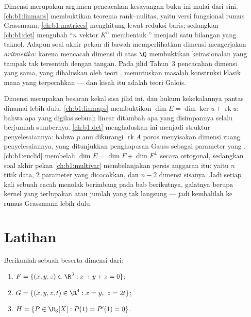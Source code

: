 \begin{remark}
\label{rem:b1:findim:whereused}
Dimensi merupakan argumen pencacahan kesayangan buku ini mulai dari sini.
\cref{ch:b1:linmaps} membuktikan teorema rank--nulitas, yaitu
versi fungsional rumus Grassmann; \cref{ch:b1:matrices}
menghitung  lewat reduksi baris; sedangkan \cref{ch:b1:det} mengubah ``$n$
vektor $K^n$ membentuk '' menjadi satu bilangan yang taknol. Adapun
soal akhir pekan di bawah memperlihatkan dimensi mengerjakan \emph{aritmetika}:
karena mencacah dimensi di atas  $\Q$ membuktikan 
keirasionalan yang tampak tak tersentuh dengan tangan. Pada jilid Tahun~3
pencacahan dimensi yang sama, yang dihaluskan oleh teori , memutuskan
masalah konstruksi klasik mana yang terpecahkan --- dan kisah itu
adalah teori Galois.
\end{remark}

\begin{remark}
\label{rem:b1:findim:perspectives}
Dimensi merupakan besaran kekal sisa jilid ini,
dan hukum kekekalannya pantas dinamai lebih dulu.
\cref{ch:b1:linmaps} membuktikan $\dim E = \dim\ker u +
\operatorname{rk} u$: bahwa apa yang digilas sebuah  linear ditambah apa yang
disimpannya selalu berjumlah sumbernya. \cref{ch:b1:det} menghaluskan ini
menjadi struktur  penyelesaiannya: bahwa $p$ anu dikurangi
$\operatorname{rk} A$ poros menyisakan dimensi
ruang penyelesaiannya, yang ditunjukkan penghapusan Gauss sebagai parameter
yang . \cref{ch:b1:euclid} membelah $\dim E = \dim F + \dim
F^\perp$ secara ortogonal, sedangkan soal akhir pekan
\cref{ch:b1:multivar} membelanjakan persis anggaran itu: yaitu $n$ titik
data, $2$ parameter yang dicocokkan, dan $n - 2$ dimensi sisanya.
Jadi setiap kali sebuah cacah menolak berimbang pada bab berikutnya,
galatnya berupa kernel yang terlupakan atau jumlah yang tak langsung --- jadi kembalilah ke
rumus Grassmann lebih dulu.
\end{remark}

\section{Latihan}

\begin{exercise}[$\star$]\label{exo:b1:findim:1}
Berikanlah sebuah  beserta dimensi dari:
\begin{enumerate}
  \item $F = \{(x,y,z) \in \R^3 : x + y + z = 0\}$;
  \item $G = \{(x,y,z,t) \in \R^4 : x = y,\ z = 2t\}$;
  \item $H = \{P \in \R_3[X] : P(1) = P'(1) = 0\}$.
\end{enumerate}
\end{exercise}

